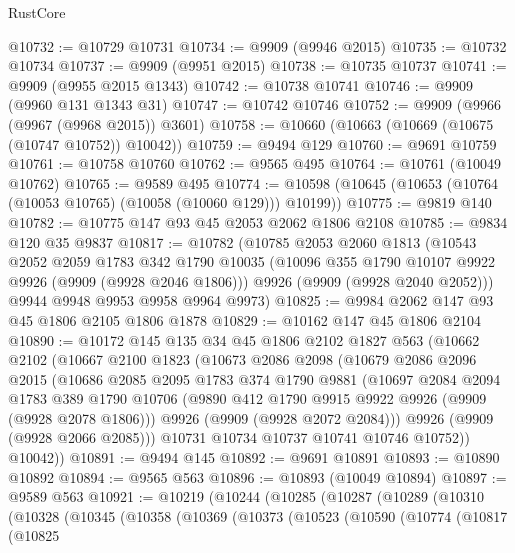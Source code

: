 \begin{lexlean}{RustCore}
\begin{coremodule}
@10732 := @10729 @10731
@10734 := @9909 (@9946 @2015)
@10735 := @10732 @10734
@10737 := @9909 (@9951 @2015)
@10738 := @10735 @10737
@10741 := @9909 (@9955 @2015 @1343)
@10742 := @10738 @10741
@10746 := @9909 (@9960 @131 @1343 @31)
@10747 := @10742 @10746
@10752 := @9909 (@9966 (@9967 (@9968 @2015)) @3601)
@10758 := @10660 (@10663 (@10669 (@10675 (@10747 @10752)) @10042))
@10759 := @9494 @129
@10760 := @9691 @10759
@10761 := @10758 @10760
@10762 := @9565 @495
@10764 := @10761 (@10049 @10762)
@10765 := @9589 @495
@10774 := @10598 (@10645 (@10653 (@10764 (@10053 @10765) (@10058 (@10060 @129))) @10199))
@10775 := @9819 @140
@10782 := @10775 @147 @93 @45 @2053 @2062 @1806 @2108
@10785 := @9834 @120 @35 @9837
@10817 := @10782
    (@10785
      @2053
      @2060
      @1813
      (@10543
        @2052
        @2059
        @1783
        @342
        @1790
        @10035
        (@10096 @355 @1790 @10107 @9922 @9926 (@9909 (@9928 @2046 @1806)))
        @9926
        (@9909 (@9928 @2040 @2052)))
      @9944
      @9948
      @9953
      @9958
      @9964
      @9973)
@10825 := @9984 @2062 @147 @93 @45 @1806 @2105 @1806 @1878
@10829 := @10162 @147 @45 @1806 @2104
@10890 := @10172
    @145
    @135
    @34
    @45
    @1806
    @2102
    @1827
    @563
    (@10662
      @2102
      (@10667
        @2100
        @1823
        (@10673
          @2086
          @2098
          (@10679
            @2086
            @2096
            @2015
            (@10686
              @2085
              @2095
              @1783
              @374
              @1790
              @9881
              (@10697
                @2084
                @2094
                @1783
                @389
                @1790
                @10706
                (@9890 @412 @1790 @9915 @9922 @9926 (@9909 (@9928 @2078 @1806)))
                @9926
                (@9909 (@9928 @2072 @2084)))
              @9926
              (@9909 (@9928 @2066 @2085)))
            @10731
            @10734
            @10737
            @10741
            @10746
            @10752))
        @10042))
@10891 := @9494 @145
@10892 := @9691 @10891
@10893 := @10890 @10892
@10894 := @9565 @563
@10896 := @10893 (@10049 @10894)
@10897 := @9589 @563
@10921 := @10219
    (@10244
      (@10285
        (@10287
          (@10289
            (@10310
              (@10328
                (@10345
                  (@10358
                    (@10369
                      (@10373
                        (@10523
                          (@10590
                            (@10774
                              (@10817
                                (@10825

\end{coremodule}
\end{lexlean}
